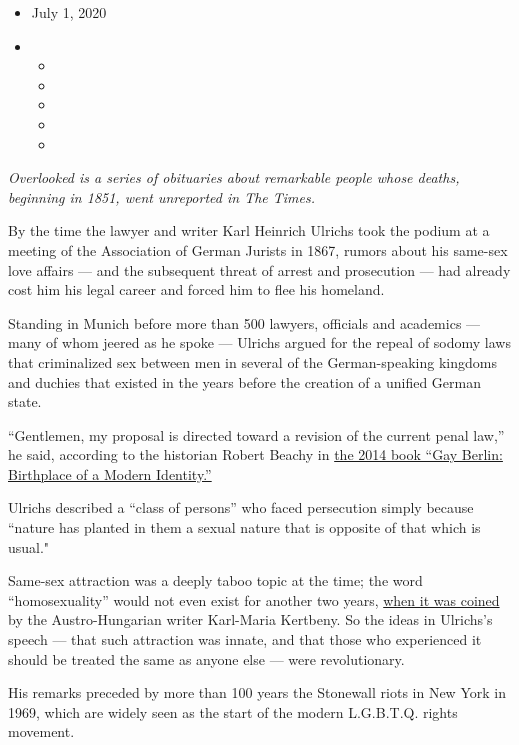 \begin{itemize}
\item
  July 1, 2020
\item
  \begin{itemize}
  \item
  \item
  \item
  \item
  \item
  \end{itemize}
\end{itemize}

\emph{Overlooked is a series of obituaries about remarkable people whose
deaths, beginning in 1851, went unreported in The Times.}

By the time the lawyer and writer Karl Heinrich Ulrichs took the podium
at a meeting of the Association of German Jurists in 1867, rumors about
his same-sex love affairs --- and the subsequent threat of arrest and
prosecution --- had already cost him his legal career and forced him to
flee his homeland.

Standing in Munich before more than 500 lawyers, officials and academics
--- many of whom jeered as he spoke --- Ulrichs argued for the repeal of
sodomy laws that criminalized sex between men in several of the
German-speaking kingdoms and duchies that existed in the years before
the creation of a unified German state.

``Gentlemen, my proposal is directed toward a revision of the current
penal law,'' he said, according to the historian Robert Beachy in
\href{https://www.nytimes.com/2014/11/02/books/review/gay-berlin-by-robert-beachy.html}{the
2014 book ``Gay Berlin: Birthplace of a Modern Identity.''}

Ulrichs described a ``class of persons'' who faced persecution simply
because ``nature has planted in them a sexual nature that is opposite of
that which is usual."

Same-sex attraction was a deeply taboo topic at the time; the word
``homosexuality'' would not even exist for another two years,
\href{https://www.bbc.com/future/article/20170315-the-invention-of-heterosexuality}{when
it was coined} by the Austro-Hungarian writer Karl-Maria Kertbeny. So
the ideas in Ulrichs's speech --- that such attraction was innate, and
that those who experienced it should be treated the same as anyone else
--- were revolutionary.

His remarks preceded by more than 100 years the Stonewall riots in New
York in 1969, which are widely seen as the start of the modern
L.G.B.T.Q. rights movement.

